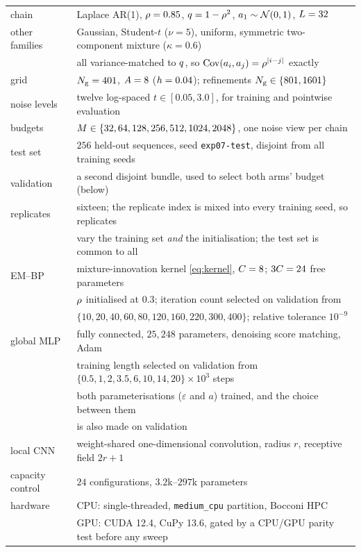 \begin{center}
\small
\begin{tabular}{ll}
\toprule
chain & Laplace AR(1), $\rho=0.85$, $q=1-\rho^2$, $a_1\sim\mathcal{N}\!\left(0,1\right)$, $L=32$ \\
other families & Gaussian, Student-$t$ ($\nu=5$), uniform, symmetric two-component mixture
                 ($\kappa=0.6$) \\
                & all variance-matched to $q$, so $\operatorname{Cov}(a_i,a_j)=\rho^{|i-j|}$ exactly \\
grid & $N_{\mathrm{g}}=401$, $A=8$ ($h=0.04$); refinements $N_{\mathrm{g}}\in\{801,1601\}$ \\
noise levels & twelve log-spaced $t\in[0.05,3.0]$, for training and pointwise evaluation \\
budgets & $M\in\{32,64,128,256,512,1024,2048\}$, one noise view per chain \\
test set & $256$ held-out sequences, seed \texttt{exp07-test}, disjoint from all training seeds \\
validation & a second disjoint bundle, used to select both arms' budget (below) \\
replicates & sixteen; the replicate index is mixed into every training seed, so replicates \\
           & vary the training set \emph{and} the initialisation; the test set is common to all \\
\midrule
EM--BP & mixture-innovation kernel \eqref{eq:kernel}, $C=8$; $3C=24$ free
         parameters \\
       & $\rho$ initialised at $0.3$; iteration count selected on validation from \\
       & $\{10,20,40,60,80,120,160,220,300,400\}$; relative tolerance $10^{-9}$ \\
global MLP & fully connected, $25{,}248$ parameters, denoising score matching, Adam \\
           & training length selected on validation from
             $\{0.5,1,2,3.5,6,10,14,20\}\times10^{3}$ steps \\
           & both parameterisations ($\varepsilon$ and $a$) trained, and the choice between
             them \\
           & is also made on validation \\
local CNN & weight-shared one-dimensional convolution, radius $r$, receptive field $2r+1$ \\
capacity control & $24$ configurations, $3.2$k--$297$k parameters \\
\midrule
hardware & CPU: single-threaded, \texttt{medium\_cpu} partition, Bocconi HPC \\
         & GPU: CUDA 12.4, CuPy 13.6, gated by a CPU/GPU parity test before any sweep \\
\bottomrule
\end{tabular}
\end{center}

